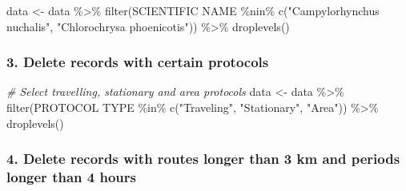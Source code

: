 \documentclass[
]{article}
\newenvironment{Shaded}{\begin{snugshade}}{\end{snugshade}}
\newcommand{\AttributeTok}[1]{\textcolor[rgb]{0.77,0.63,0.00}{#1}}
\newcommand{\CommentTok}[1]{\textcolor[rgb]{0.56,0.35,0.01}{\textit{#1}}}
\newcommand{\FunctionTok}[1]{\textcolor[rgb]{0.00,0.00,0.00}{#1}}
\newcommand{\NormalTok}[1]{#1}
\newcommand{\OtherTok}[1]{\textcolor[rgb]{0.56,0.35,0.01}{#1}}
\newcommand{\SpecialCharTok}[1]{\textcolor[rgb]{0.00,0.00,0.00}{#1}}
\newcommand{\StringTok}[1]{\textcolor[rgb]{0.31,0.60,0.02}{#1}}
\begin{document}
\begin{Shaded}
\begin{Highlighting}[]
\NormalTok{data }\OtherTok{\textless{}{-}}\NormalTok{ data }\SpecialCharTok{\%\textgreater{}\%} 
  \FunctionTok{filter}\NormalTok{(}\StringTok{\textasciigrave{}}\AttributeTok{SCIENTIFIC NAME}\StringTok{\textasciigrave{}} \SpecialCharTok{\%nin\%} \FunctionTok{c}\NormalTok{(}\StringTok{"Campylorhynchus nuchalis"}\NormalTok{, }\StringTok{"Chlorochrysa phoenicotis"}\NormalTok{)) }\SpecialCharTok{\%\textgreater{}\%} \FunctionTok{droplevels}\NormalTok{()}
\end{Highlighting}
\end{Shaded}

\hypertarget{delete-records-with-certain-protocols}{%
\subsubsection{3. Delete records with certain
protocols}\label{delete-records-with-certain-protocols}}

\begin{Shaded}
\begin{Highlighting}[]
\CommentTok{\# Select travelling, stationary and area protocols  }
\NormalTok{data }\OtherTok{\textless{}{-}}\NormalTok{ data }\SpecialCharTok{\%\textgreater{}\%} 
  \FunctionTok{filter}\NormalTok{(}\StringTok{\textasciigrave{}}\AttributeTok{PROTOCOL TYPE}\StringTok{\textasciigrave{}} \SpecialCharTok{\%in\%} \FunctionTok{c}\NormalTok{(}\StringTok{"Traveling"}\NormalTok{, }\StringTok{"Stationary"}\NormalTok{, }\StringTok{"Area"}\NormalTok{)) }\SpecialCharTok{\%\textgreater{}\%} 
  \FunctionTok{droplevels}\NormalTok{()}
\end{Highlighting}
\end{Shaded}

\hypertarget{delete-records-with-routes-longer-than-3-km-and-periods-longer-than-4-hours}{%
\subsubsection{4. Delete records with routes longer than 3 km and
periods longer than 4
hours}\label{delete-records-with-routes-longer-than-3-km-and-periods-longer-than-4-hours}}
\end{document}
